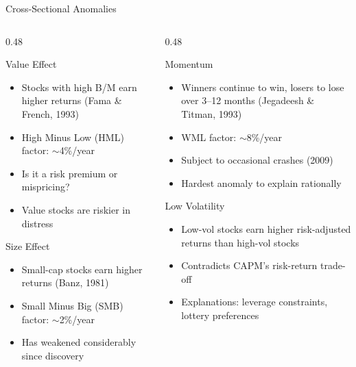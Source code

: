 \documentclass[9pt, aspectratio=169, t]{beamer}
\theoremstyle{definition}
\newenvironment{cminipage}[1]{%
    \par\noindent\hfill\begin{minipage}{#1}\ignorespaces
}{%
    \end{minipage}\hfill\null\par
}
\begin{document}
\begin{frame}{Cross-Sectional Anomalies}
\begin{cminipage}{0.95\textwidth}
\small
\begin{columns}[T]
\begin{column}{0.48\textwidth}
\begin{block}{Value Effect}
\begin{itemize}\setlength{\itemsep}{0pt}
    \item Stocks with high B/M earn higher returns (Fama \& French, 1993)
    \item High Minus Low (HML) factor: $\sim$4\%/year
    \item Is it a risk premium or mispricing?
    \item Value stocks are riskier in distress
\end{itemize}
\end{block}

\begin{block}{Size Effect}
\begin{itemize}\setlength{\itemsep}{0pt}
    \item Small-cap stocks earn higher returns (Banz, 1981)
    \item Small Minus Big (SMB) factor: $\sim$2\%/year
    \item Has weakened considerably since discovery
\end{itemize}
\end{block}
\end{column}
\begin{column}{0.48\textwidth}
\begin{block}{Momentum}
\begin{itemize}\setlength{\itemsep}{0pt}
    \item Winners continue to win, losers to lose over 3--12 months (Jegadeesh \& Titman, 1993)
    \item WML factor: $\sim$8\%/year
    \item Subject to occasional crashes (2009)
    \item Hardest anomaly to explain rationally
\end{itemize}
\end{block}

\begin{block}{Low Volatility}
\begin{itemize}\setlength{\itemsep}{0pt}
    \item Low-vol stocks earn higher risk-adjusted returns than high-vol stocks
    \item Contradicts CAPM's risk-return trade-off
    \item Explanations: leverage constraints, lottery preferences
\end{itemize}
\end{block}
\end{column}
\end{columns}
\end{cminipage}
\end{frame}
\end{document}
